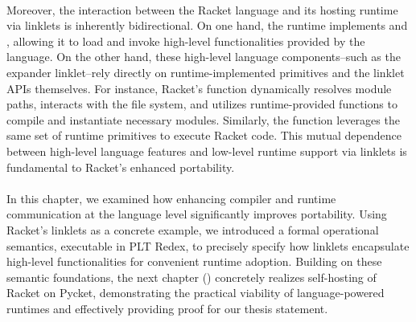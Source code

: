		\paragraph{}%
			Moreover, the interaction between the Racket language and its hosting runtime via linklets is inherently bidirectional. On one hand, the runtime implements  and , allowing it to load and invoke high-level functionalities provided by the language. On the other hand, these high-level language components--such as the expander linklet--rely directly on runtime-implemented primitives and the linklet APIs themselves. For instance, Racket's  function dynamically resolves module paths, interacts with the file system, and utilizes runtime-provided functions to compile and instantiate necessary modules. Similarly, the  function leverages the same set of runtime primitives to execute Racket code. This mutual dependence between high-level language features and low-level runtime support via linklets is fundamental to Racket's enhanced portability.

		\paragraph{}%
			In this chapter, we examined how enhancing compiler and runtime communication at the language level significantly improves portability. Using Racket’s linklets as a concrete example, we introduced a formal operational semantics, executable in PLT Redex, to precisely specify how linklets encapsulate high-level functionalities for convenient runtime adoption. Building on these semantic foundations, the next chapter () concretely realizes self-hosting of Racket on Pycket, demonstrating the practical viability of language-powered runtimes and effectively providing proof for our thesis statement.


